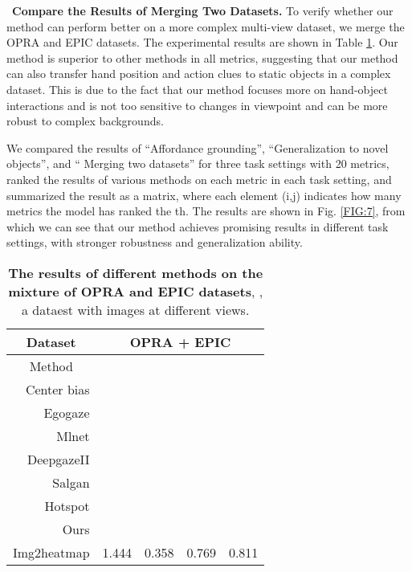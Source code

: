 \documentclass[journal,twoside]{IEEEtran}
\newcommand{\myPara}[1]{\vspace{5pt}\noindent~\textbf{#1} \quad}
\begin{document}
\myPara{Compare the Results of Merging Two Datasets.}
To verify whether our method can perform better on a more complex multi-view dataset, we merge the OPRA \cite{demo2vec2018cvpr} and EPIC \cite{Damen2018EPICKITCHENS} datasets. The experimental results are shown in Table \ref{Table:2}. Our method is superior to other methods in all metrics, suggesting that our method can also transfer hand position and action clues to static objects in a complex dataset. This is due to the fact that our method focuses more on hand-object interactions and is not too sensitive to changes in viewpoint and can be more robust to complex backgrounds.

\par We compared the results of ``Affordance grounding'', ``Generalization to novel objects'', and `` Merging two datasets'' for three task settings with 20 metrics, ranked the results of various methods on each metric in each task setting, and summarized the result as a matrix, where each element (i,j) indicates how many metrics the model has ranked the th. The results are shown in Fig. \ref{FIG:7}, from which we can see that our method achieves promising results in different task settings, with stronger robustness and generalization ability.

\begin{table}[t]
    \caption{\textbf{The results of different methods on the mixture of OPRA \cite{demo2vec2018cvpr} and EPIC \cite{Damen2018EPICKITCHENS} datasets}, , a dataest with images at different views.
    }
    \label{Table:2}
  \begin{center}
  \small
  \renewcommand{\arraystretch}{1.}
  \renewcommand{\tabcolsep}{8pt}
  \begin{tabular}{r|cccc}
    \hline\toprule
    \multicolumn{1}{c|}{\textbf{Dataset}} & \multicolumn{4}{c}{\textbf{OPRA} \cite{demo2vec2018cvpr} \textbf{+} \textbf{EPIC} \cite{Damen2018EPICKITCHENS}} \\ 
    \hline
    \multicolumn{1}{c|}{Method} & \emph{} & \emph{} & \emph{} & \emph{} \\
    \hline
    Center bias &  &  &  &  \\	
    Egogaze\cite{DBLP:conf/eccv/HuangCLS18} &	 &  &  &    \\
    Mlnet\cite{DBLP:conf/icpr/CorniaBSC16} &  &  &  &   \\
    DeepgazeII\cite{Pan_2017_SalGAN} &  &  &  &   \\
    Salgan\cite{DBLP:journals/corr/KummererWB16} &  &  &  &    \\
    Hotspot\cite{interaction-hotspots} &  &  &  &  \\
     \hline
     \rowcolor{mygray}
    Ours &  &  &  &    \\    
     \hline
    Img2heatmap \cite{interaction-hotspots} & 1.444 & 0.358 & 0.769 & 0.811 \\
    \hline\bottomrule
    \end{tabular}
    \end{center}
  
  \end{table}
\end{document}
